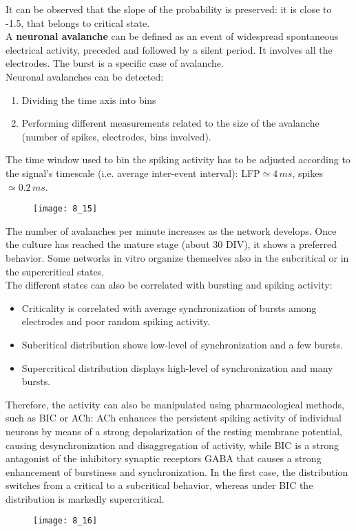 It can be observed that the slope of the probability is preserved: it is close to -1.5, that belongs to critical state.\\
A \textbf{neuronal avalanche} can be defined as an event of widespread spontaneous electrical activity, preceded and followed by a silent period. It involves all the electrodes. The burst is a specific case of avalanche.\\
Neuronal avalanches can be detected:
\begin{enumerate}
    \item Dividing the time axis into bins
    \item Performing different measurements related to the size of the avalanche (number of spikes, electrodes, bins involved).
\end{enumerate}
The time window used to bin the spiking activity has to be adjusted according to the signal's timescale (i.e. average inter-event interval): LFP\(\simeq4\,ms\), spikes\(\simeq0.2\,ms\).
\begin{figure}[H]
    \texttt{[image: 8\_15]}
    \centering
\end{figure}
The number of avalanches per minute increases as the network develops. Once the culture has reached the mature stage (about 30 DIV), it shows a preferred behavior. Some networks in vitro organize themselves also in the subcritical or in the supercritical states.\\
The different states can also be correlated with bursting and spiking activity:
\begin{itemize}
    \item Criticality is correlated with average synchronization of bursts among electrodes and poor random spiking activity.
    \item Subcritical distribution shows low-level of synchronization and a few bursts.
    \item Supercritical distribution displays high-level of synchronization and many bursts.
\end{itemize} 
Therefore, the activity can also be manipulated using pharmacological methods, such as BIC or ACh: ACh enhances the persistent spiking activity of individual neurons by means of a strong depolarization of the resting membrane potential, causing desynchronization and disaggregation of activity, while BIC is a strong antagonist of the inhibitory synaptic receptors GABA that causes a strong enhancement of burstiness and synchronization.
In the first case, the distribution switches from a critical to a subcritical behavior, whereas under BIC the distribution is markedly supercritical.
\begin{figure}[H]
    \texttt{[image: 8\_16]}
    \centering
\end{figure}
